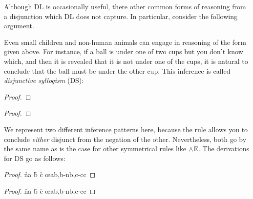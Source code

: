 Although DL is occasionally useful, there other common forms of reasoning from a disjunction which DL does not capture.
In particular, consider the following argument.

\begin{earg}
\end{earg}

Even small children and non-human animals can engage in reasoning of the form given above.
For instance, if a ball is under one of two cups but you don't know which, and then it is revealed that it is not under one of the cups, it is natural to conclude that the ball must be under the other cup.
This inference is called \textit{disjunctive syllogism} (DS):

\begin{multicols}{2}

\begin{proof}
	\metaA{} 
\end{proof}

\begin{proof}
	\metaB{} 
\end{proof}

\end{multicols}

We represent two different inference patterns here, because the rule allows you to conclude \emph{either} disjunct from the negation of the other.
Nevertheless, both go by the same name as is the case for other symmetrical rules like $\wedge$E.
The derivations for DS go as follows:

\begin{multicols}{2}

\begin{proof}
  \open 
     
      \open
         
         \r{na}
         \r{b}
      \close
     
  \close
  \open
     
     \r{c}
  \close
   \oe{ab,b-nb,c-cc}
\end{proof}

\begin{proof}
  \open 
     
      \open
         
         \r{na}
         \r{b}
      \close
     
  \close
  \open
     
     \r{c}
  \close
   \oe{ab,b-nb,c-cc}
\end{proof}

    
\end{multicols}


